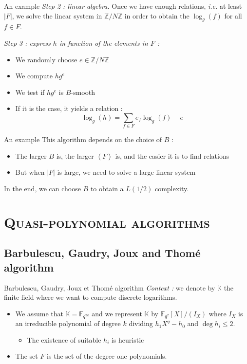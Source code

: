\documentclass[xcolor=x11names,compress]{beamer}
\theoremstyle{break}
\theoremstyle{sc}
\theoremstyle{definition}
\theoremstyle{remark}
\newcommand{\ie}{\emph{i.e. }}
\begin{document}
\begin{frame}{An example}
  \emph{Step 2 : linear algebra.} Once we have enough relations, \ie at least
  $|F|$, we solve the linear system in $\mathbb{Z}/N\mathbb{Z}$ in order to
  obtain the $\log_g(f)$ for all $f\in F$.
  
  \emph{Step 3 : express $h$ in function of the elements in $F$ :}
  \begin{itemize}
     \item We randomly choose $e\in \mathbb{Z}/N\mathbb{Z}$
    \item We compute $hg^e$
    \item We test if $hg^e$ is $B$-smooth
    \item If it is the case, it yields a relation  :
     \[
      \log_g(h) = \sum_{f\in F}e_f\log_g(f) - e
      \]
  \end{itemize}

\end{frame}

\begin{frame}{An example}
  This algorithm depends on the choice of $B$ :
  \begin{itemize}
    \item The larger $B$ is, the larger $\left\langle F \right\rangle$ is, and
      the easier it is to find relations
    \item But when $|F|$ is large, we need to solve a large linear system
  \end{itemize}
  In the end, we can choose $B$ to obtain a $L(1/2)$ complexity.
\end{frame}

\section{\scshape Quasi-polynomial algorithms} 
\subsection{Barbulescu, Gaudry, Joux and Thomé algorithm}

\begin{frame}{Barbulescu, Gaudry, Joux et Thomé algorithm}
  \emph{Context :} we denote by $\mathbb{K}$ the finite field where we want to
  compute discrete logarithms. 
  \begin{itemize}
    \item We assume that $\mathbb{K}=\mathbb{F}_{q^{2k}}$ and we represent
      $\mathbb{K}$ by $\mathbb{F}_{q^2}[X]/(I_X)$ where $I_X$ is an irreducible
      polynomial of degree $k$ dividing $h_1X^q-h_0$ and $\deg h_i\leq 2$.
      \begin{itemize}
        \item The existence of suitable $h_i$ is heuristic
      \end{itemize}
    \item The set $F$ is the set of the degree one polynomials.
\end{itemize}
\end{frame}
\end{document}
